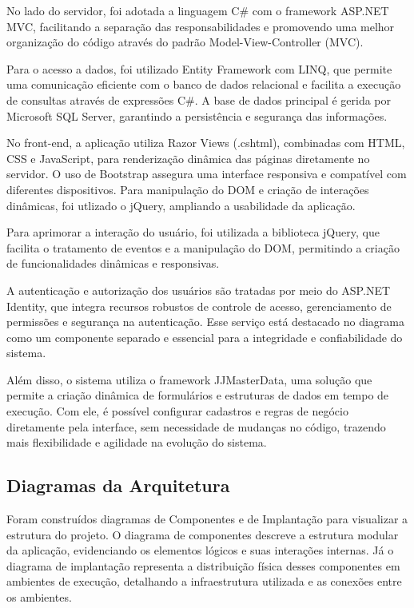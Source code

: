 \documentclass[
	12pt,				%
	openany,			%
	twoside,			%
	a4paper,			%
	english,			%
	brazil				%
	]{abntex2}
\begin{document}
No lado do servidor, foi adotada a linguagem C\# com o framework ASP.NET MVC, facilitando a separação das responsabilidades e promovendo uma melhor organização do código através do padrão Model-View-Controller (MVC).

Para o acesso a dados, foi utilizado Entity Framework com LINQ, que permite uma comunicação eficiente com o banco de dados relacional e facilita a execução de consultas através de expressões C\#. A base de dados principal é gerida por Microsoft SQL Server, garantindo a persistência e segurança das informações.

No front-end, a aplicação utiliza Razor Views (.cshtml), combinadas com HTML, CSS e JavaScript, para renderização dinâmica das páginas diretamente no servidor. O uso de Bootstrap assegura uma interface responsiva e compatível com diferentes dispositivos. Para manipulação do DOM e criação de interações dinâmicas, foi utlizado o jQuery, ampliando a usabilidade da aplicação.

Para aprimorar a interação do usuário, foi utilizada a biblioteca jQuery, que facilita o tratamento de eventos e a manipulação do DOM, permitindo a criação de funcionalidades dinâmicas e responsivas.

A autenticação e autorização dos usuários são tratadas por meio do ASP.NET Identity, que integra recursos robustos de controle de acesso, gerenciamento de permissões e segurança na autenticação. Esse serviço está destacado no diagrama como um componente separado e essencial para a integridade e confiabilidade do sistema.

Além disso, o sistema utiliza o framework JJMasterData, uma solução que permite a criação dinâmica de formulários e estruturas de dados em tempo de execução. Com ele, é possível configurar cadastros e regras de negócio diretamente pela interface, sem necessidade de mudanças no código, trazendo mais flexibilidade e agilidade na evolução do sistema.

\subsection{Diagramas da Arquitetura}

Foram construídos diagramas de Componentes e de Implantação para visualizar a estrutura do projeto. O diagrama de componentes descreve a estrutura modular da aplicação, evidenciando os elementos lógicos e suas interações internas. Já o diagrama de implantação representa a distribuição física desses componentes em ambientes de execução, detalhando a infraestrutura utilizada e as conexões entre os ambientes.
\end{document}
